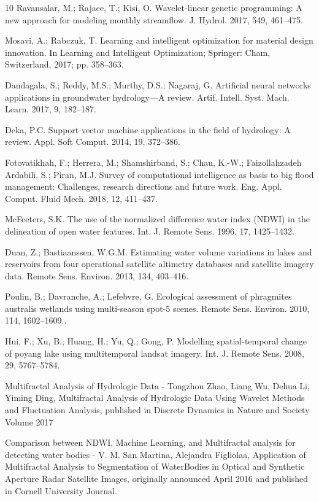 \documentclass[12pt, a4paper]{report}
\begin{document}
\begin{thebibliography} {10}
Ravansalar, M.; Rajaee, T.; Kisi, O. Wavelet-linear genetic programming: A new approach for modeling monthly streamflow. J. Hydrol. 2017, 549, 461–475.

Mosavi, A.; Rabczuk, T. Learning and intelligent optimization for material design innovation. In Learning and Intelligent Optimization; Springer: Cham, Switzerland, 2017; pp. 358–363.

Dandagala, S.; Reddy, M.S.; Murthy, D.S.; Nagaraj, G. Artificial neural networks applications in groundwater hydrology—A review. Artif. Intell. Syst. Mach. Learn. 2017, 9, 182–187.

Deka, P.C. Support vector machine applications in the field of hydrology: A review. Appl. Soft Comput. 2014,
19, 372–386.

Fotovatikhah, F.; Herrera, M.; Shamshirband, S.; Chau, K.-W.; Faizollahzadeh Ardabili, S.; Piran, M.J. Survey of computational intelligence as basis to big flood management: Challenges, research directions and future work. Eng. Appl. Comput. Fluid Mech. 2018, 12, 411–437. 

McFeeters, S.K. The use of the normalized difference water index (NDWI) in the delineation of open water features. Int. J. Remote Sens. 1996, 17, 1425–1432.

Duan, Z.; Bastiaanssen, W.G.M. Estimating water volume variations in lakes and reservoirs from four operational satellite altimetry databases and satellite imagery data. Remote Sens. Environ. 2013, 134, 403–416.

Poulin, B.; Davranche, A.; Lefebvre, G. Ecological assessment of phragmites australis wetlands using multi-season spot-5 scenes. Remote Sens. Environ. 2010, 114, 1602–1609..

Hui, F.; Xu, B.; Huang, H.; Yu, Q.; Gong, P. Modelling spatial-temporal change of poyang lake using multitemporal landsat imagery. Int. J. Remote Sens. 2008, 29, 5767–5784.

Multifractal Analysis of Hydrologic Data -
Tongzhou Zhao, Liang Wu, Dehua Li, Yiming Ding, Multifractal Analysis of Hydrologic Data Using Wavelet Methods and Fluctuation Analysis, published in Discrete Dynamics in Nature and Society
Volume 2017

Comparison between NDWI, Machine Learning, and Multifractal analysis for detecting water bodies -  
V. M. San Martina, Alejandra Figliolaa, Application of Multifractal Analysis to Segmentation of WaterBodies in Optical and Synthetic Aperture Radar Satellite Images, originally announced April 2016 and published in Cornell University Journal.


\end{thebibliography}
\end{document}
